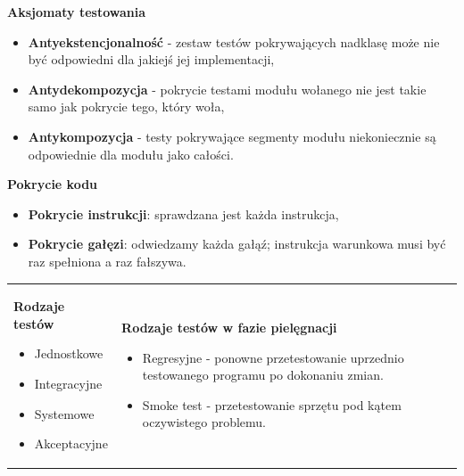 \documentclass[a4paper]{article}
\begin{document}
    \textbf{Aksjomaty testowania}
    \begin{itemize}
        \item \textbf{Antyekstencjonalność} - zestaw testów pokrywających nadklasę może nie być odpowiedni
        dla jakiejś jej implementacji,
        \item \textbf{Antydekompozycja} - pokrycie testami modułu wołanego nie jest takie samo
        jak pokrycie tego, który woła,
        \item \textbf{Antykompozycja} - testy pokrywające segmenty modułu niekoniecznie są odpowiednie
        dla modułu jako całości.
    \end{itemize}


    \textbf{Pokrycie kodu}
    \begin{itemize}
        \item \textbf{Pokrycie instrukcji}: sprawdzana jest każda instrukcja,
        \item \textbf{Pokrycie gałęzi}: odwiedzamy każda gałąź; instrukcja warunkowa musi być raz spełniona a raz fałszywa.
    \end{itemize}


    \begin{table}[H]
        \begin{center}
            \begin{tabular}{ p{} p{} }
                \textbf{Rodzaje testów}
                \begin{itemize}
                    \item Jednostkowe
                    \item Integracyjne
                    \item Systemowe
                    \item Akceptacyjne
                \end{itemize}
&
                \textbf{Rodzaje testów w fazie pielęgnacji}
                \begin{itemize}
                    \item Regresyjne - ponowne przetestowanie uprzednio testowanego programu po dokonaniu zmian.
                    \item Smoke test - przetestowanie sprzętu pod kątem oczywistego problemu.
                \end{itemize}
            \end{tabular}
        \end{center}
    \end{table}
\end{document}
